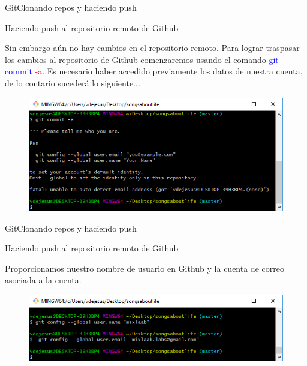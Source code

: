 \documentclass[10pt]{beamer}
\begin{document}
\begin{frame}{Git}{Clonando repos y haciendo push}

\begin{block}{Haciendo push al repositorio remoto de Github}

Sin embargo aún no hay cambios en el repositorio remoto. Para lograr traspasar los cambios al repositorio de Github comenzaremos usando el comando \textcolor{blue}{git commit} \textcolor{red}{-a}. Es necesario haber accedido previamente los datos de nuestra cuenta, de lo contario sucederá lo siguiente...

\begin{figure}[h!]
\centering
\includegraphics [scale=0.45]{gitcommit}
\label{fig:gitcommit}
\end{figure}

\end{block}

\end{frame}

\begin{frame}{Git}{Clonando repos y haciendo push}

\begin{block}{Haciendo push al repositorio remoto de Github}

Proporcionamos nuestro nombre de usuario en Github y la cuenta de correo asociada a la cuenta.

\begin{figure}[h!]
\centering
\includegraphics [scale=0.6]{gitlogin}
\label{fig:gitlogin}
\end{figure}

\end{block}

\end{frame}
\end{document}
